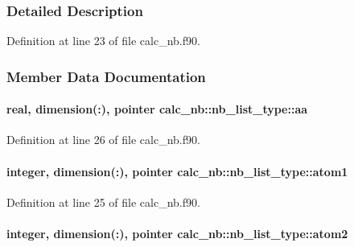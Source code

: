 \subsubsection{Detailed Description}


Definition at line 23 of file calc\-\_\-nb.\-f90.



\subsubsection{Member Data Documentation}
\hypertarget{structcalc__nb_1_1nb__list__type_a8f29d9b8ef04324f2d01fb2fd46676dd}{
\paragraph[{aa}]{\setlength{\rightskip}{0pt plus 5cm}real, dimension(\-:), pointer calc\-\_\-nb\-::nb\-\_\-list\-\_\-type\-::aa}}\label{structcalc__nb_1_1nb__list__type_a8f29d9b8ef04324f2d01fb2fd46676dd}


Definition at line 26 of file calc\-\_\-nb.\-f90.

\hypertarget{structcalc__nb_1_1nb__list__type_a2928459700a98302496379f1e8cf75b4}{
\paragraph[{atom1}]{\setlength{\rightskip}{0pt plus 5cm}integer, dimension(\-:), pointer calc\-\_\-nb\-::nb\-\_\-list\-\_\-type\-::atom1}}\label{structcalc__nb_1_1nb__list__type_a2928459700a98302496379f1e8cf75b4}


Definition at line 25 of file calc\-\_\-nb.\-f90.

\hypertarget{structcalc__nb_1_1nb__list__type_a7ae08aa09ac66530236f4db05133cee2}{
\paragraph[{atom2}]{\setlength{\rightskip}{0pt plus 5cm}integer, dimension(\-:), pointer calc\-\_\-nb\-::nb\-\_\-list\-\_\-type\-::atom2}}\label{structcalc__nb_1_1nb__list__type_a7ae08aa09ac66530236f4db05133cee2}


